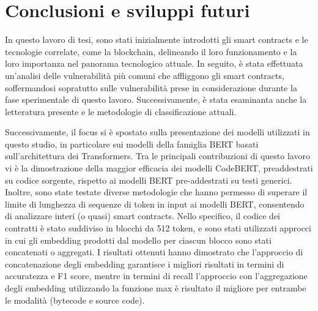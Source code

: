 \documentclass[../../Thesis.tex]{subfiles}
\begin{document}
\chapter{Conclusioni e sviluppi futuri}
\label{cap:conclusioni}
In questo lavoro di tesi, sono stati inizialmente introdotti gli smart contracts e le tecnologie correlate, come la blockchain, delineando il loro funzionamento e la loro importanza nel panorama tecnologico attuale. In seguito, è stata effettuata un'analisi delle vulnerabilità più comuni che affliggono gli smart contracts, soffermandosi sopratutto sulle vulnerabilità prese in considerazione durante la fase sperimentale di questo lavoro. Successivamente, è stata esaminanta anche la letteratura presente e le metodologie di classificazione attuali. 

Successivamente, il focus si è spostato sulla presentazione dei modelli utilizzati in questo studio, in particolare sui modelli della famiglia BERT basati sull'architettura dei Transformers. Tra le principali contribuzioni di questo lavoro vi è la dimostrazione della maggior efficacia dei modelli CodeBERT, preaddestrati su codice sorgente, rispetto ai modelli BERT pre-addestrati su testi generici. 
Inoltre, sono state testate diverse metodologie che hanno permesso di superare il limite di lunghezza di sequenze di token in input ai modelli BERT, consentendo di analizzare interi (o quasi) smart contracts. Nello specifico, il codice dei contratti è stato suddiviso in blocchi da 512 token, e sono stati utilizzati approcci in cui gli embedding prodotti dal modello per ciascun blocco sono stati concatenati o aggregati. I risultati ottenuti hanno dimostrato che l'approccio di concatenazione degli embedding garantisce i migliori risultati in termini di accuratezza e F1 score, mentre in termini di recall l'approccio con l'aggregazione degli embedding utilizzando la funzione max è risultato il migliore per entrambe le modalità (bytecode e source code).
\end{document}
